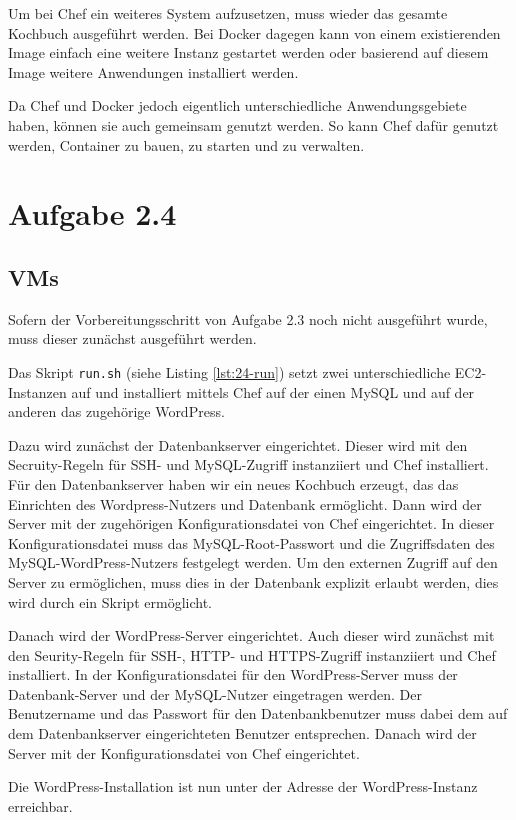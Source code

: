 \documentclass[a4paper]{scrartcl}
\begin{document}
Um bei Chef ein weiteres System aufzusetzen, muss wieder das gesamte Kochbuch ausgeführt werden. Bei Docker dagegen kann von einem existierenden Image einfach eine weitere Instanz gestartet werden oder basierend auf diesem Image weitere Anwendungen installiert werden.

Da Chef und Docker jedoch eigentlich unterschiedliche Anwendungsgebiete haben, können sie auch gemeinsam genutzt werden. So kann Chef dafür genutzt werden, Container zu bauen, zu starten und zu verwalten.

\section*{Aufgabe 2.4}
\subsection*{VMs}
Sofern der Vorbereitungsschritt von Aufgabe 2.3 noch nicht ausgeführt wurde, muss dieser zunächst ausgeführt werden.

Das Skript \texttt{run.sh} (siehe Listing \ref{lst:24-run}) setzt zwei unterschiedliche EC2-Instanzen auf und installiert mittels Chef auf der einen MySQL und auf der anderen das zugehörige WordPress. 

Dazu wird zunächst der Datenbankserver eingerichtet. Dieser wird mit den Secruity-Regeln für SSH- und MySQL-Zugriff instanziiert und Chef installiert. Für den Datenbankserver haben wir ein neues Kochbuch erzeugt, das das Einrichten des Wordpress-Nutzers und Datenbank ermöglicht. Dann wird der Server mit der zugehörigen Konfigurationsdatei von Chef eingerichtet. In dieser Konfigurationsdatei muss das MySQL-Root-Passwort und die Zugriffsdaten des MySQL-WordPress-Nutzers festgelegt werden. Um den externen Zugriff auf den Server zu ermöglichen, muss dies in der Datenbank explizit erlaubt werden, dies wird durch ein Skript ermöglicht. 

Danach wird der WordPress-Server eingerichtet. Auch dieser wird zunächst mit den Seurity-Regeln für SSH-, HTTP- und HTTPS-Zugriff instanziiert und Chef installiert. In der Konfigurationsdatei für den WordPress-Server muss der Datenbank-Server und der MySQL-Nutzer eingetragen werden. Der Benutzername und das Passwort für den Datenbankbenutzer muss dabei dem auf dem Datenbankserver eingerichteten Benutzer entsprechen. Danach wird der Server mit der Konfigurationsdatei von Chef eingerichtet.

Die WordPress-Installation ist nun unter der Adresse der WordPress-Instanz erreichbar.
\end{document}
